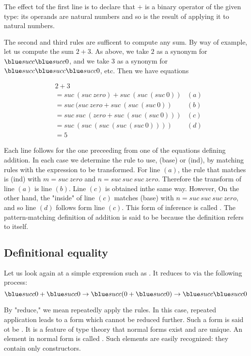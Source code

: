 The effect tof the first line is to declare that $+$ is a binary operator of the given type: its operands are natural numbers and so is the result of applying it to natural numbers.


The second and third rules are sufficent to compute any sum.
By way of example, let us compute the sum $2 + 3$.  As above, we take $2$ as a synonym for $\suc \suc 0$, and we take $3$ as a synonym for $\suc \suc \suc 0$, etc.
Then we have equations

\begin{align}
& 2 + 3 \\
 & = suc\ (suc\ zero) + suc\ (suc\ (suc\ 0)) & (a)\\
& = suc\ (suc\ zero + suc\ (suc\ (suc\ 0))  & (b)\\
& =  suc\ suc\ (zero + suc\ (suc\ (suc\ 0)))  &(c) \\
& =  suc\ (suc\ ( suc\ (suc\ (suc\ 0)) )) & (d) \\
& = 5  
\end{align}

Each line  follows for the one preceeding from one of the  equations defining addition.  In each case  we determine the rule to use, (base) or (ind), by matching rules with the expression to be transformed.  For  line $(a)$, the rule that matches is  (ind) with $m = suc\  zero$ and $n = suc\ suc\ suc\ zero$. Therefore the transform of line $(a)$ is line $(b)$.  Line $(c)$ is obtained inthe same way.  However, On the other hand, the "inside" of line $(c)$ matches (base) with $n = suc\ suc\ suc\ zero$, and so line $(d)$ follows form line $(c)$.  This form of inference is called .  The pattern-matching definition of addition is said to be  because the definition refers to itself.  


\subsection{Definitional equality}

Let us look again at a simple expression such as  . It reduces to  via the following process:
$$
\suc 0 + \suc 0 \to \suc ( 0 + \suc 0) \to \suc \suc 0
$$

By "reduce," we mean repeatedly apply the rules. In this case, repeated application leads to a form which cannot be reduced further.  Such a form is said ot be .  It is a feature of type theory that normal forms exist and are unique.  An element in normal form is called .  Such elements are easily recognized: they contain only constructors.


